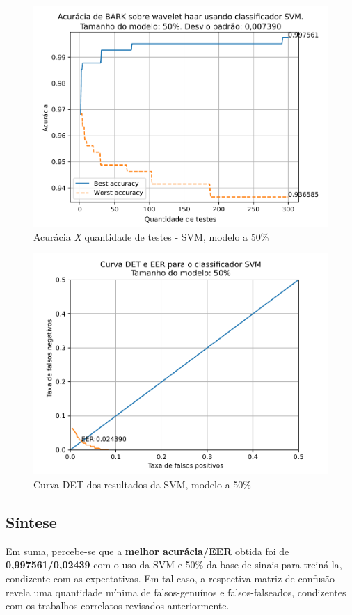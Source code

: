 			\begin{figure}[H]
				\centering
				\includegraphics[width=.9\linewidth]{images/results/confusionMatrices/classifier_SVM_50}
				\caption{Acurácia \textit{X} quantidade de testes - SVM, modelo a 50\%}
				\label{fig:classifiersvm50}
			\end{figure}
		
			\begin{figure}[H]
				\centering
				\includegraphics[width=.9\linewidth]{images/results/det/DET_for_classifier_SVM_50}
				\caption{Curva DET dos resultados da SVM, modelo a 50\%}
				\label{fig:detsvm50}
			\end{figure}

		\subsection{Síntese}
   			\par Em suma, percebe-se que a \textbf{melhor acurácia/EER} obtida foi de \textbf{0,997561/0,02439} com o uso da SVM e 50\% da base de sinais para treiná-la, condizente com as expectativas. Em tal caso, a respectiva matriz de confusão revela uma quantidade mínima de falsos-genuínos e falsos-falseados, condizentes com os trabalhos correlatos revisados anteriormente.

